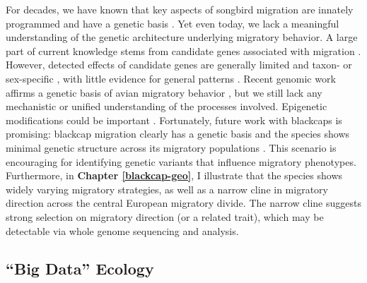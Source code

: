 \documentclass[a4paper, nobind]{templates/ociamthesis}
\begin{document}
For decades, we have known that key aspects of songbird migration are innately programmed and have a genetic basis \autocites[e.g.~][]{bertholdGeneticBasisMigratory1981}{bertholdHeritabilityMigratoryActivity1994}{gwinnerCircannualClocksAvian1996}{helbigGeneticBasisMode1996}{pulidoFrequencyMigrantsMigratory1996}. Yet even today, we lack a meaningful understanding of the genetic architecture underlying migratory behavior. A large part of current knowledge stems from candidate genes associated with migration \autocites[e.g.~][]{muellerIdentificationGeneAssociated2011}{sainoPolymorphismClockGene2015}{johnstonSeasonalGeneExpression2016}{lugoramosCandidateGenesMigration2017}. However, detected effects of candidate genes are generally limited and taxon- or sex-specific \autocite{muellerIdentificationGeneAssociated2011,sainoPolymorphismClockGene2015,mettlerInteractionsCandidateGene2015,bazziCandidateGenesHave2017,bazziAdcyap1PolymorphismCovaries2016,parody-merinoNoEvidenceAssociation2019,ralstonLengthPolymorphismsTwo2019}, with little evidence for general patterns \autocites{lugoramosCandidateGenesMigration2017}[but see e.g.~][]{bazziClockGenePolymorphism2016}. Recent genomic work affirms a genetic basis of avian migratory behavior \autocite{delmoreGeneticsSeasonalMigration2016,toewsSelectionVPS13ALinked2019a}, but we still lack any mechanistic or unified understanding of the processes involved. Epigenetic modifications could be important \autocite{sainoMigrationPhenologyBreeding2017}. Fortunately, future work with blackcaps is promising: blackcap migration clearly has a genetic basis \autocite{bertholdRapidMicroevolutionMigratory1992,helbigInheritanceNovelMigratory1994,helbigGeneticBasisMode1996} and the species shows minimal genetic structure across its migratory populations \autocites{delmoreEvolutionaryHistoryGenomics2020}[but also see][]{rolshausenContemporaryEvolutionReproductive2009}. This scenario is encouraging for identifying genetic variants that influence migratory phenotypes. Furthermore, in \textbf{Chapter \ref{blackcap-geo}}, I illustrate that the species shows widely varying migratory strategies, as well as a narrow cline in migratory direction across the central European migratory divide. The narrow cline suggests strong selection on migratory direction (or a related trait), which may be detectable via whole genome sequencing and analysis.

\hypertarget{big-data-ecology}{%
\subsection*{``Big Data'' Ecology}\label{big-data-ecology}}
\end{document}
